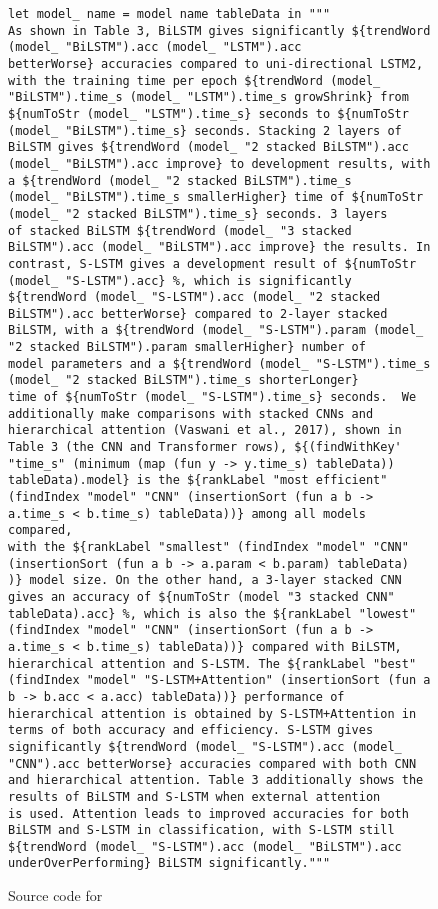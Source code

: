 \begin{figure}[h]
    \small
    \begin{lstlisting}[language=Fluid,mathescape=false]
let model_ name = model name tableData in """
As shown in Table 3, BiLSTM gives significantly ${trendWord (model_ "BiLSTM").acc (model_ "LSTM").acc
betterWorse} accuracies compared to uni-directional LSTM2, with the training time per epoch ${trendWord (model_
"BiLSTM").time_s (model_ "LSTM").time_s growShrink} from ${numToStr (model_ "LSTM").time_s} seconds to ${numToStr
(model_ "BiLSTM").time_s} seconds. Stacking 2 layers of BiLSTM gives ${trendWord (model_ "2 stacked BiLSTM").acc
(model_ "BiLSTM").acc improve} to development results, with a ${trendWord (model_ "2 stacked BiLSTM").time_s
(model_ "BiLSTM").time_s smallerHigher} time of ${numToStr (model_ "2 stacked BiLSTM").time_s} seconds. 3 layers
of stacked BiLSTM ${trendWord (model_ "3 stacked BiLSTM").acc (model_ "BiLSTM").acc improve} the results. In
contrast, S-LSTM gives a development result of ${numToStr (model_ "S-LSTM").acc} %, which is significantly
${trendWord (model_ "S-LSTM").acc (model_ "2 stacked BiLSTM").acc betterWorse} compared to 2-layer stacked
BiLSTM, with a ${trendWord (model_ "S-LSTM").param (model_ "2 stacked BiLSTM").param smallerHigher} number of
model parameters and a ${trendWord (model_ "S-LSTM").time_s (model_ "2 stacked BiLSTM").time_s shorterLonger}
time of ${numToStr (model_ "S-LSTM").time_s} seconds.  We additionally make comparisons with stacked CNNs and
hierarchical attention (Vaswani et al., 2017), shown in Table 3 (the CNN and Transformer rows), ${(findWithKey'
"time_s" (minimum (map (fun y -> y.time_s) tableData)) tableData).model} is the ${rankLabel "most efficient"
(findIndex "model" "CNN" (insertionSort (fun a b -> a.time_s < b.time_s) tableData))} among all models compared,
with the ${rankLabel "smallest" (findIndex "model" "CNN" (insertionSort (fun a b -> a.param < b.param) tableData)
)} model size. On the other hand, a 3-layer stacked CNN gives an accuracy of ${numToStr (model "3 stacked CNN"
tableData).acc} %, which is also the ${rankLabel "lowest" (findIndex "model" "CNN" (insertionSort (fun a b ->
a.time_s < b.time_s) tableData))} compared with BiLSTM, hierarchical attention and S-LSTM. The ${rankLabel "best"
(findIndex "model" "S-LSTM+Attention" (insertionSort (fun a b -> b.acc < a.acc) tableData))} performance of
hierarchical attention is obtained by S-LSTM+Attention in terms of both accuracy and efficiency. S-LSTM gives
significantly ${trendWord (model_ "S-LSTM").acc (model_ "CNN").acc betterWorse} accuracies compared with both CNN
and hierarchical attention. Table 3 additionally shows the results of BiLSTM and S-LSTM when external attention
is used. Attention leads to improved accuracies for both BiLSTM and S-LSTM in classification, with S-LSTM still
${trendWord (model_ "S-LSTM").acc (model_ "BiLSTM").acc underOverPerforming} BiLSTM significantly."""
    \end{lstlisting}
    \caption{Source code for }
    \label{fig:fluid-example-paragraph}
\end{figure}
